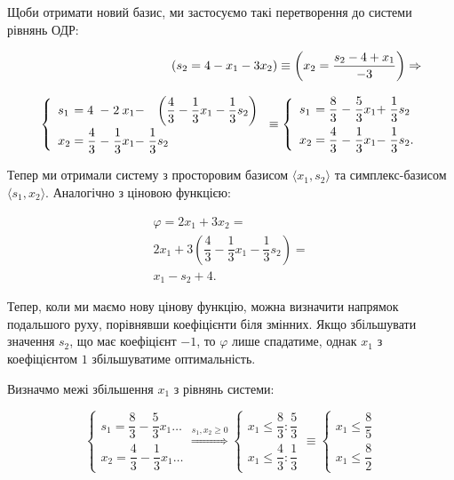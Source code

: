 \documentclass[\main/book.tex]{subfiles}
\begin{document}
Щоби отримати новий базис, ми застосуємо такі перетворення до системи рівнянь ОДР:

\[
\begin{split}
 (s_2 = 4 - x_1 - 3 x_2) \equiv
 \left(x_2 =  \dfrac{s_2 - 4 + x_1}{-3}\right) \Rightarrow \\[8pt]
 \left\{
  \begin{array}{l@{\;}l@{\;}l@{\;}l@{}l@{}l@{\;}l@{}l}
   s_1 &= 4& - & 2&x_1 &- & &\left(\dfrac{4}{3} - \dfrac{1}{3} x_1 - \dfrac{1}{3} s_2\right) \\[8pt]
   x_2 &= \dfrac{4}{3} &- &\dfrac{1}{3} &x_1 &- &\dfrac{1}{3} &s_2
  \end{array}
 \right. \equiv
 \left\{
  \begin{array}{l@{\;}l@{\;}l@{\;}l@{}l@{}l@{\;}l@{}l}
   s_1 &= \dfrac{8}{3} & - & \dfrac{5}{3} &x_1 &+ &\dfrac{1}{3} & s_2 \\[8pt]
   x_2 &= \dfrac{4}{3} &- &\dfrac{1}{3} &x_1 &- &\dfrac{1}{3} &s_2
   \text{.}
  \end{array}
 \right.
\end{split}
\]
 
Тепер ми отримали систему з просторовим базисом $\langle x_1, s_2 \rangle$ та симплекс-базисом $\langle s_1, x_2 \rangle$. Аналогічно з ціновою функцією:

\[
\begin{split}
  \varphi = 2 x_1 + 3 x_2 = \\
  2 x_1 + 3 \left(\dfrac{4}{3} - \dfrac{1}{3} x_1 - \dfrac{1}{3} s_2\right) = \\
  x_1 - s_2 + 4
  \text{.}
\end{split}
\]

Тепер, коли ми маємо нову цінову функцію, можна визначити напрямок подальшого руху, порівнявши коефіцієнти біля змінних. Якщо збільшувати значення $s_2$, що має коефіцієнт $-1$, то $\varphi$ лише спадатиме, однак $x_1$ з коефіцієнтом $1$ збільшуватиме оптимальність.

Визначмо межі збільшення $x_1$ з рівнянь системи:

\[
 \left\{\begin{array}{l}
  s_1 = \dfrac{8}{3} - \dfrac{5}{3} x_1 \ldots \\[8pt]
  x_2 = \dfrac{4}{3} - \dfrac{1}{3} x_1 \ldots
 \end{array}\right.
 \overset{s_1, x_2 \geq 0}{\Rightarrow}
 \left\{\begin{array}{l}
  x_1 \leq \dfrac{8}{3} : \dfrac{5}{3} \\[8pt]
  x_1 \leq \dfrac{4}{3} : \dfrac{1}{3}
 \end{array}\right.
 \equiv
 \left\{\begin{array}{l}
  x_1 \leq \dfrac{8}{5} \\[8pt]
  x_1 \leq \dfrac{8}{2}
 \end{array}\right.
\]
\end{document}
